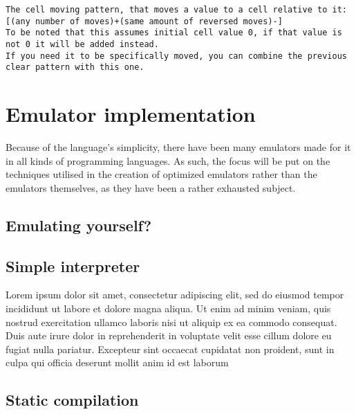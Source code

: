 \begin{verbatim}
The cell moving pattern, that moves a value to a cell relative to it:
[(any number of moves)+(same amount of reversed moves)-]
To be noted that this assumes initial cell value 0, if that value is not 0 it will be added instead.
If you need it to be specifically moved, you can combine the previous clear pattern with this one.
\end{verbatim}

\clearpage

\section{Emulator implementation}
\label{sec:ch2sec2}

\par Because of the language's simplicity, there have been many emulators made for it in all kinds of programming languages. As such, the focus will be put on the techniques utilised in the creation of optimized emulators rather than the emulators themselves, as they have been a rather exhausted subject.


\subsection{Emulating yourself?}
\label{sec:ch2sec2sub1}

\par 

\subsection{Simple interpreter}
\label{sec:ch2sec2sub2}

\par Lorem ipsum dolor sit amet, consectetur adipiscing elit, sed do eiusmod tempor incididunt ut labore et dolore magna aliqua. Ut enim ad minim veniam, quis nostrud exercitation ullamco laboris nisi ut aliquip ex ea commodo consequat. Duis aute irure dolor in reprehenderit in voluptate velit esse cillum dolore eu fugiat nulla pariatur. Excepteur sint occaecat cupidatat non proident, sunt in culpa qui officia deserunt mollit anim id est laborum

\subsection{Static compilation}
\label{sec:ch2sec2sub3}

